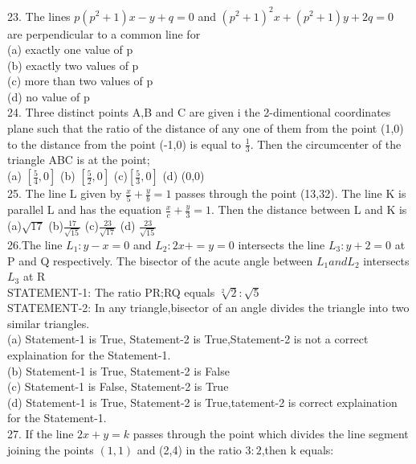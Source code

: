 \documentclass[12pt]{article}
\begin{document}
23. The lines $p(p^2+1)x-y+q=0$ and $(p^2+1)^2x+(p^2+1)y+2q=0$ are perpendicular to a common line for \\
(a) exactly one value of p\\
(b) exactly two values of p\\
(c) more than two values of p\\
(d) no value of p\\
24. Three distinct points A,B and C are given i the 2-dimentional coordinates plane such that the ratio of the  distance of any one of them from the point (1,0) to the distance from the point (-1,0) is equal to $\frac{1}{3}$. Then the circumcenter of the triangle ABC is at the point;\\
(a) $[\frac{5}{4} ,0]$ \hspace{1cm} (b) $[\frac{5}{2} ,0]$ \hspace{1cm} (c)$[\frac{5}{3} ,0] $\hspace{1cm} (d) (0,0)\\
25. The line L given by $\frac{x}{5}+\frac{y}{b}=1$ passes through the point (13,32). The line K is parallel L and has the equation $\frac{x}{c}+\frac{y}{3}=1$. Then the distance between L and K is \\
(a)$\sqrt{17}$  \hspace{1cm} (b)$\frac{17}{\sqrt{15}}$ \hspace{1cm} (c)$\frac{23}{\sqrt{17}}$ \hspace{1cm} (d) $\frac{23}{\sqrt{15}}$\\
 26.The line $L_1:y-x=0$ and $L_2: 2x+=y=0$ intersects the line $L_3: y+2=0$ at P and Q respectively. The bisector of the acute angle between $L_1 and L_2$ intersects $L_3$ at R\\
 STATEMENT-1: The ratio PR;RQ equals $\sqrt[2]{2}:\sqrt{5}$\\
 STATEMENT-2: In any triangle,bisector of an angle divides the triangle into two similar triangles.\\
(a) Statement-1 is True, Statement-2 is True,Statement-2 is not a correct explaination for the Statement-1.\\
(b) Statement-1 is True, Statement-2 is False\\
(c) Statement-1 is False, Statement-2 is True\\
(d) Statement-1 is True, Statement-2 is True,tatement-2 is correct explaination for the Statement-1.\\
27. If the line $2x +y=k$ passes through the point which divides the line segment joining the points $(1,1)$ and (2,4) in the ratio $3:2$,then k equals:\\
\end{document}
